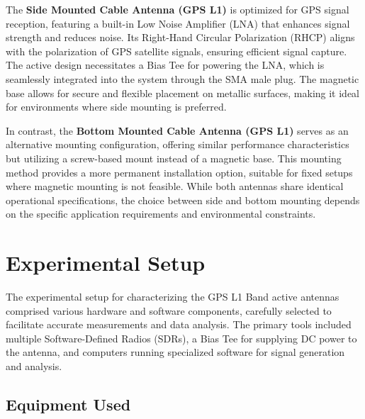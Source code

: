 \documentclass[12pt,letter]{article}
\begin{document}
The \textbf{Side Mounted Cable Antenna (GPS L1)} is optimized for GPS signal reception, featuring a built-in Low Noise Amplifier (LNA) that enhances signal strength and reduces noise. Its Right-Hand Circular Polarization (RHCP) aligns with the polarization of GPS satellite signals, ensuring efficient signal capture. The active design necessitates a Bias Tee for powering the LNA, which is seamlessly integrated into the system through the SMA male plug. The magnetic base allows for secure and flexible placement on metallic surfaces, making it ideal for environments where side mounting is preferred.

In contrast, the \textbf{Bottom Mounted Cable Antenna (GPS L1)} serves as an alternative mounting configuration, offering similar performance characteristics but utilizing a screw-based mount instead of a magnetic base. This mounting method provides a more permanent installation option, suitable for fixed setups where magnetic mounting is not feasible. While both antennas share identical operational specifications, the choice between side and bottom mounting depends on the specific application requirements and environmental constraints.


\newpage
\section*{Experimental Setup}

The experimental setup for characterizing the GPS L1 Band active antennas comprised various hardware and software components, carefully selected to facilitate accurate measurements and data analysis. The primary tools included multiple Software-Defined Radios (SDRs), a Bias Tee for supplying DC power to the antenna, and computers running specialized software for signal generation and analysis.

\subsection*{Equipment Used}
\end{document}
